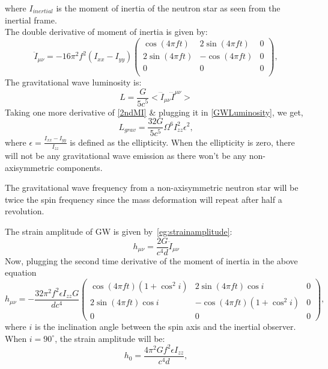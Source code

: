 \documentclass{ttuthes2007}
\begin{document}
where $I_{inertial}$ is the moment of inertia of the neutron star as seen from
the inertial frame.\\
The double derivative of moment of inertia is given by:
\begin{equation} \label{2ndMI}
\ddot{I}_{\mu\nu}=-16\pi ^2f^2(I_{xx}-I_{yy})
\begin{pmatrix}
\cos{(4\pi f t)} & 2\sin{(4\pi f t)} & 0 \\
2\sin{(4\pi f t)} & -\cos{(4\pi f t)} & 0 \\
0 & 0 & 0 \\
\end{pmatrix},
\end{equation}
The gravitational wave luminosity is:
\begin{equation}\label{GWLuminosity}
L= \frac{G}{5c^5}<\dddot{I}_{\mu\nu}\dddot{I}^{\mu\nu}>
\end{equation}
Taking one more derivative of \ref{2ndMI} \& plugging it in \ref{GWLuminosity}, we get,
\begin{equation}\label{Lgw}
L_{grav}= \frac{32G}{5c^5}\Omega ^6 I_{zz}^2\epsilon ^2,
\end{equation}
where $\epsilon =\frac{I_{xx}-I_{yy}}{I_{zz}}$ is defined as the ellipticity. When
the ellipticity is zero, there will not be any gravitational wave emission as there won't be any non-axisymmetric components.

The gravitational wave frequency from a non-axisymmetric neutron star will be
twice the spin frequency since the mass deformation will repeat after half a
revolution.

The strain amplitude of \ac{GW} is given by~\ref{eg:strainamplitude}:
\begin{equation}
h_{\mu\nu}=\frac{2G}{c^4d}\ddot{I}_{\mu\nu}
\end{equation}
Now, plugging the second time derivative of the moment of inertia in the above equation
\begin{equation} \label{3rdMI}
h_{\mu\nu}=-\frac{32\pi^2f^2 \epsilon I_{zz}G}{dc^4}
\begin{pmatrix}
\cos(4\pi f t)(1+\cos^2{i}) & 2\sin{(4\pi f t)}\cos{i} & 0 \\
2\sin{(4\pi f t)}\cos{i} & -\cos{(4\pi f t)}(1+\cos ^2i) & 0 \\
0 & 0 & 0 
\end{pmatrix},
\end{equation}
where $i$ is the inclination angle between the spin axis and
the inertial observer. When $i=90^\circ$, the strain amplitude will be:
\begin{equation}
h_0=\frac{4\pi ^2Gf^2 \epsilon I_{zz}}{c^4d},
\end{equation}
\end{document}
